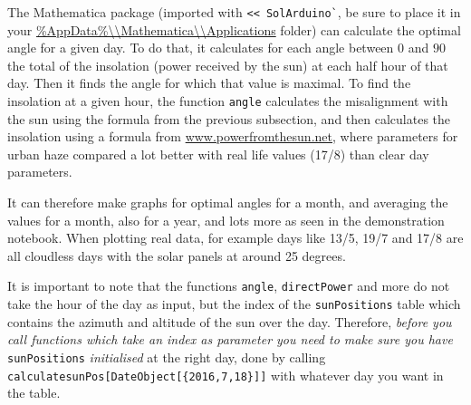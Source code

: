 \documentclass{article}
\begin{document}
			   The Mathematica package (imported with \verb|<< SolArduino`|, be sure to place it in your
			    \url{\%AppData\%\\Mathematica\\Applications} folder) can calculate the optimal angle for a given day. To do that, it calculates for each angle between $0$ and $90$ the total of the insolation (power received by the sun) at each half hour of that day. Then it finds the angle for which that value is maximal. To find the insolation at a given hour, the function \verb|angle| calculates the misalignment with the sun using the formula from the previous subsection, and then calculates the insolation using a formula from \href{http://www.powerfromthesun.net/Book/chapter02/chapter02.html#ZEqnNum929295 }{www.powerfromthesun.net}, where parameters for urban haze compared a lot better with real life values (17/8) than clear day parameters.
			   
			   It can therefore make graphs for optimal angles for a month, and averaging the values for a month, also for a year, and lots more as seen in the demonstration notebook. When plotting real data, for example days like  13/5, 19/7 and 17/8 are all cloudless days with the solar panels at around 25 degrees.
			   
			   It is important to note that the functions \verb|angle|, \verb|directPower| and more do not take the hour of the day as input, but the index of the \verb|sunPositions| table which contains the azimuth and altitude of the sun over the day. Therefore, \textit{before you call functions which take an index as parameter you need to make sure you have }\verb|sunPositions| \textit{initialised} at the right day, done by calling \verb|calculatesunPos[DateObject[{2016,7,18}]]| with whatever day you want in the table.
			   	
\end{document}
